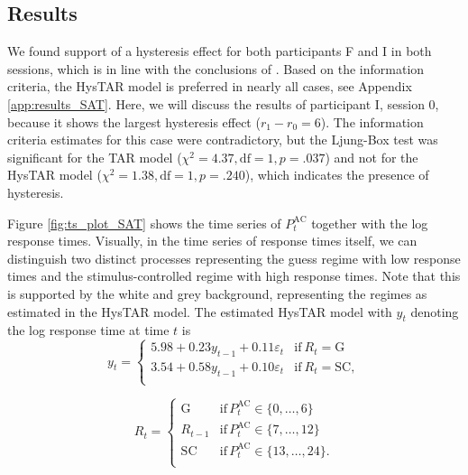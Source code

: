 \documentclass{article}
\begin{document}
\subsection{Results}
We found support of a hysteresis effect for both participants F and I in both sessions, which is in line with the conclusions of \citet{speedaccuracy}.
Based on the information criteria, the HysTAR model is preferred in nearly all cases, see Appendix \ref{app:results_SAT}.
Here, we will discuss the results of participant I, session 0, because it shows the largest hysteresis effect ($r_1 - r_0 = 6$). 
The information criteria estimates for this case were contradictory, 
but the Ljung-Box test was significant for the TAR model ($\chi^2 = 4.37, \text{df} = 1, p = .037$) and not for the HysTAR model ($\chi^2 = 1.38, \text{df} = 1, p = .240$), which indicates the presence of hysteresis.

Figure \ref{fig:ts_plot_SAT} shows the time series of $P^{\mathrm{AC}}_t$ together with the log response times.
Visually, in the time series of response times itself, we can distinguish two distinct processes representing the guess regime with low response times and the stimulus-controlled regime with high response times.
Note that this is supported by the white and grey background, representing the regimes as estimated in the HysTAR model.
The estimated HysTAR model with $y_t$ denoting the log response time at time $t$ is
\begin{equation}
y_t = 
\begin{cases}
5.98 + 0.23 y_{t-1} + 0.11 \varepsilon_t & \text{if}~R_{t} = \mathrm{G}\\
3.54 + 0.58 y_{t-1} + 0.10 \varepsilon_t & \text{if}~R_{t} = \mathrm{SC}, \\
\end{cases}
\end{equation}

\begin{equation} 
R_t = \begin{cases}
\mathrm{G} & \mathrm{if} \, P^{\mathrm{AC}}_{t} \in \{0, \dots, 6\} \\
R_{t-1} & \mathrm{if} \, P^{\mathrm{AC}}_{t} \in \{7, \dots, 12\} \\
\mathrm{SC} & \mathrm{if} \, P^{\mathrm{AC}}_{t} \in \{13, \dots, 24\}. \\
\end{cases}
\end{equation}
\end{document}
